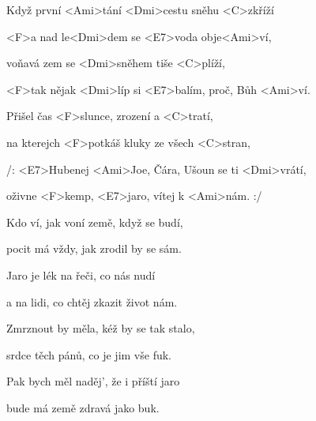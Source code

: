 

\zs
Když první <Ami>tání <Dmi>cestu sněhu <C>zkříží

<F>a nad le<Dmi>dem se <E7>voda obje<Ami>ví,

voňavá zem se <Dmi>sněhem tiše <C>plíží,

<F>tak nějak <Dmi>líp si <E7>balím, proč, Bůh <Ami>ví.
\ks



\zr
Přišel čas <F>slunce, zrození a <C>tratí,

na kterejch <F>potkáš kluky ze všech <C>stran,

/: <E7>Hubenej <Ami>Joe, Čára, Ušoun se ti <Dmi>vrátí,

oživne <F>kemp, <E7>jaro, vítej k <Ami>nám. :/
\kr

\zs
Kdo ví, jak voní země, když se budí,

pocit má vždy, jak zrodil by se sám.

Jaro je lék na řeči, co nás nudí

a na lidi, co chtěj zkazit život nám.
\ks


\zr \kr


\zs
Zmrznout by měla, kéž by se tak stalo,

srdce těch pánů, co je jim vše fuk.

Pak bych měl naděj', že i příští jaro

bude má země zdravá jako buk.
\ks

\zr \kr

\kp






